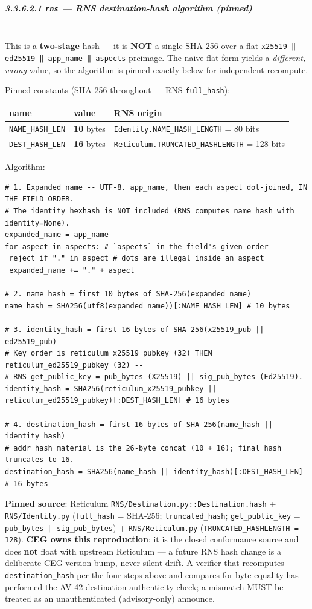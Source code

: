 \documentclass[11pt]{article}
\begin{document}
\subparagraph{3.3.6.2.1 \texttt{rns} — RNS destination-hash algorithm (pinned)}\mbox{}\\


This is a \textbf{two-stage} hash — it is \textbf{NOT} a single SHA-256 over a flat \texttt{x25519 ‖ ed25519 ‖ app\_name ‖ aspects} preimage. The naive flat form yields a \textit{different, wrong} value, so the algorithm is pinned exactly below for independent recompute.


Pinned constants (SHA-256 throughout — RNS \texttt{full\_hash}):


{\footnotesize
\begin{longtable}{|p{5.33cm}|p{5.33cm}|p{5.33cm}|}\hline
\textbf{name} & \textbf{value} & \textbf{RNS origin} \\ \hline\endhead
\texttt{NAME\_HASH\_LEN} & \textbf{10} bytes & \texttt{Identity.NAME\_HASH\_LENGTH} = 80 bits \\ \hline
\texttt{DEST\_HASH\_LEN} & \textbf{16} bytes & \texttt{Reticulum.TRUNCATED\_HASHLENGTH} = 128 bits \\ \hline
\end{longtable}}


Algorithm:


\begin{lstlisting}
# 1. Expanded name -- UTF-8. app_name, then each aspect dot-joined, IN THE FIELD ORDER.
# The identity hexhash is NOT included (RNS computes name_hash with identity=None).
expanded_name = app_name
for aspect in aspects: # `aspects` in the field's given order
 reject if "." in aspect # dots are illegal inside an aspect
 expanded_name += "." + aspect

# 2. name_hash = first 10 bytes of SHA-256(expanded_name)
name_hash = SHA256(utf8(expanded_name))[:NAME_HASH_LEN] # 10 bytes

# 3. identity_hash = first 16 bytes of SHA-256(x25519_pub || ed25519_pub)
# Key order is reticulum_x25519_pubkey (32) THEN reticulum_ed25519_pubkey (32) --
# RNS get_public_key = pub_bytes (X25519) || sig_pub_bytes (Ed25519).
identity_hash = SHA256(reticulum_x25519_pubkey || reticulum_ed25519_pubkey)[:DEST_HASH_LEN] # 16 bytes

# 4. destination_hash = first 16 bytes of SHA-256(name_hash || identity_hash)
# addr_hash_material is the 26-byte concat (10 + 16); final hash truncates to 16.
destination_hash = SHA256(name_hash || identity_hash)[:DEST_HASH_LEN] # 16 bytes
\end{lstlisting}

\textbf{Pinned source}: Reticulum \texttt{RNS/Destination.py::Destination.hash} + \texttt{RNS/Identity.py} (\texttt{full\_hash} = SHA-256; \texttt{truncated\_hash}; \texttt{get\_public\_key} = \texttt{pub\_bytes ‖ sig\_pub\_bytes}) + \texttt{RNS/Reticulum.py} (\texttt{TRUNCATED\_HASHLENGTH = 128}). \textbf{CEG owns this reproduction}: it is the closed conformance source and does \textbf{not} float with upstream Reticulum — a future RNS hash change is a deliberate CEG version bump, never silent drift. A verifier that recomputes \texttt{destination\_hash} per the four steps above and compares for byte-equality has performed the AV-42 destination-authenticity check; a mismatch MUST be treated as an unauthenticated (advisory-only) announce.
\end{document}
